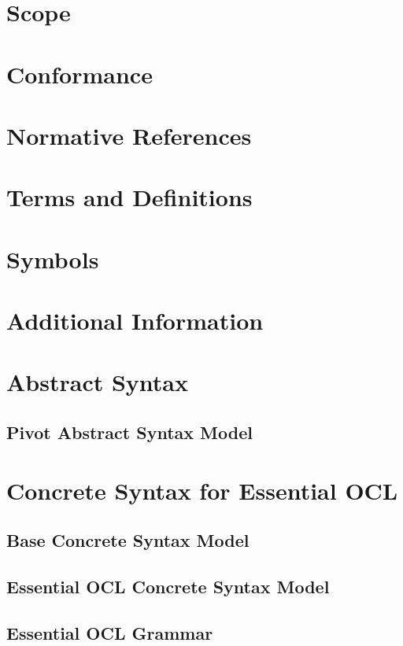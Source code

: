 \documentclass{scrreprt}   %
\begin{document}
\chapter{Scope}
\chapter{Conformance}
\chapter{Normative References}
\chapter{Terms and Definitions}
\chapter{Symbols}
\chapter{Additional Information}

\chapter{Abstract Syntax}\label{ocl:AbstractSyntax}
\section{Pivot Abstract Syntax Model}


\chapter{Concrete Syntax for Essential OCL}\label{ocl:EssentialOCLConcreteSyntax}
\section{Base Concrete Syntax Model}

\section{Essential OCL Concrete Syntax Model}

\section{Essential OCL Grammar}

\end{document}
